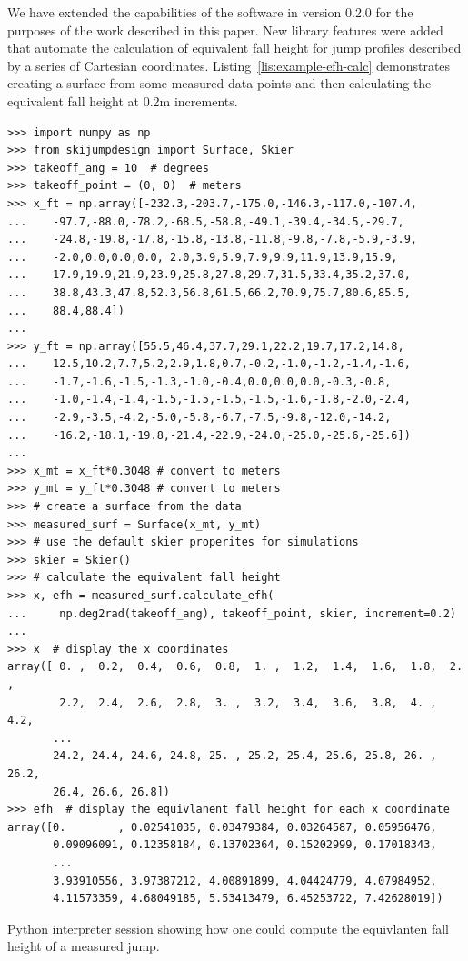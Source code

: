 \documentclass{article}
\begin{document}
We have extended the capabilities of the software in version 0.2.0 for the
purposes of the work described in this paper. New library features were added
that automate the calculation of equivalent fall height for jump profiles
described by a series of Cartesian coordinates.
Listing~\ref{lis:example-efh-calc} demonstrates creating a surface from some
measured data points and then calculating the equivalent fall height at
0.2\si{\meter} increments.
%
\begin{listing*}
  \begin{verbatim}
>>> import numpy as np
>>> from skijumpdesign import Surface, Skier
>>> takeoff_ang = 10  # degrees
>>> takeoff_point = (0, 0)  # meters
>>> x_ft = np.array([-232.3,-203.7,-175.0,-146.3,-117.0,-107.4,
...    -97.7,-88.0,-78.2,-68.5,-58.8,-49.1,-39.4,-34.5,-29.7,
...    -24.8,-19.8,-17.8,-15.8,-13.8,-11.8,-9.8,-7.8,-5.9,-3.9,
...    -2.0,0.0,0.0,0.0, 2.0,3.9,5.9,7.9,9.9,11.9,13.9,15.9,
...    17.9,19.9,21.9,23.9,25.8,27.8,29.7,31.5,33.4,35.2,37.0,
...    38.8,43.3,47.8,52.3,56.8,61.5,66.2,70.9,75.7,80.6,85.5,
...    88.4,88.4])
...
>>> y_ft = np.array([55.5,46.4,37.7,29.1,22.2,19.7,17.2,14.8,
...    12.5,10.2,7.7,5.2,2.9,1.8,0.7,-0.2,-1.0,-1.2,-1.4,-1.6,
...    -1.7,-1.6,-1.5,-1.3,-1.0,-0.4,0.0,0.0,0.0,-0.3,-0.8,
...    -1.0,-1.4,-1.4,-1.5,-1.5,-1.5,-1.5,-1.6,-1.8,-2.0,-2.4,
...    -2.9,-3.5,-4.2,-5.0,-5.8,-6.7,-7.5,-9.8,-12.0,-14.2,
...    -16.2,-18.1,-19.8,-21.4,-22.9,-24.0,-25.0,-25.6,-25.6])
...
>>> x_mt = x_ft*0.3048 # convert to meters
>>> y_mt = y_ft*0.3048 # convert to meters
>>> # create a surface from the data
>>> measured_surf = Surface(x_mt, y_mt)
>>> # use the default skier properites for simulations
>>> skier = Skier()
>>> # calculate the equivalent fall height
>>> x, efh = measured_surf.calculate_efh(
...     np.deg2rad(takeoff_ang), takeoff_point, skier, increment=0.2)
...
>>> x  # display the x coordinates
array([ 0. ,  0.2,  0.4,  0.6,  0.8,  1. ,  1.2,  1.4,  1.6,  1.8,  2. ,
        2.2,  2.4,  2.6,  2.8,  3. ,  3.2,  3.4,  3.6,  3.8,  4. ,  4.2,
       ...
       24.2, 24.4, 24.6, 24.8, 25. , 25.2, 25.4, 25.6, 25.8, 26. , 26.2,
       26.4, 26.6, 26.8])
>>> efh  # display the equivlanent fall height for each x coordinate
array([0.        , 0.02541035, 0.03479384, 0.03264587, 0.05956476,
       0.09096091, 0.12358184, 0.13702364, 0.15202999, 0.17018343,
       ...
       3.93910556, 3.97387212, 4.00891899, 4.04424779, 4.07984952,
       4.11573359, 4.68049185, 5.53413479, 6.45253722, 7.42628019])
  \end{verbatim}
  \caption{Python interpreter session showing how one could compute the
  equivlanten fall height of a measured jump.}
  \label{lis:example-efh-calc}
\end{listing*}
\end{document}
